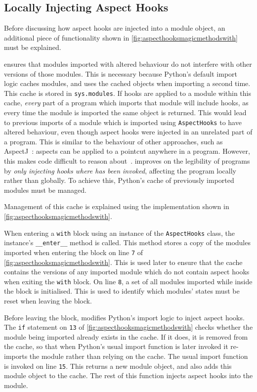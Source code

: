 \subsection{Locally Injecting Aspect Hooks}
\label{local_aspect_hook_effects}

Before discussing how aspect hooks are injected into a module object, an
additional piece of functionality shown in
\cref{fig:aspecthooksmagicmethodswith} must be explained.

\pdsf{} ensures that modules imported with altered behaviour do not interfere
with other versions of those modules. This is necessary because Python's default
import logic caches modules, and uses the cached objects when importing a second
time. This cache is stored in \lstinline{sys.modules}. If hooks are applied to a
module within this cache, \emph{every} part of a program which imports that
module will include hooks, as every time the module is imported the same object
is returned. This would lead to previous imports of a module which is imported
using \lstinline{AspectHooks} to have altered behaviour, even though aspect
hooks were injected in an unrelated part of a program. This is similar to the
behaviour of other \aop{} approaches, such as
AspectJ~\cite{AspectJLanguageAndTools}: aspects can be applied to a pointcut
anywhere in a program. However, this makes code difficult to reason
about~\cite{steimann06paradoxical,przybylek2010wrong}. \pdsf{} improves on the
legibility of \aspectoriented programs by \emph{only injecting hooks where
\pdsf{} has been invoked}, affecting the program locally rather than globally.
To achieve this, Python's cache of previously imported modules must be managed.

Management of this cache is explained using the implementation shown in
\cref{fig:aspecthooksmagicmethodswith}.

When entering a \lstinline{with} block using an instance of the
\lstinline{AspectHooks} class, the instance's \lstinline{__enter__} method is
called. This method stores a copy of the modules imported when entering the
block on line \texttt{7} of \cref{fig:aspecthooksmagicmethodswith}. This is used
later to ensure that the cache contains the versions of any imported module
which do not contain aspect hooks when exiting the \lstinline{with} block. On
line \texttt{8}, a set of all modules imported while inside the block is
initialised. This is used to identify which modules' states must be reset when
leaving the block.

Before leaving the block, \pdsf{} modifies Python's import logic to inject
aspect hooks. The \lstinline{if} statement on \texttt{13} of
\cref{fig:aspecthooksmagicmethodswith} checks whether the module being imported
already exists in the cache. If it does, it is removed from the cache, so that
when Python's usual import function is later invoked it re-imports the module
rather than relying on the cache. The usual import function is invoked on line
\texttt{15}. This returns a new module object, and also adds this module object
to the cache. The rest of this function injects aspect hooks into the module.

